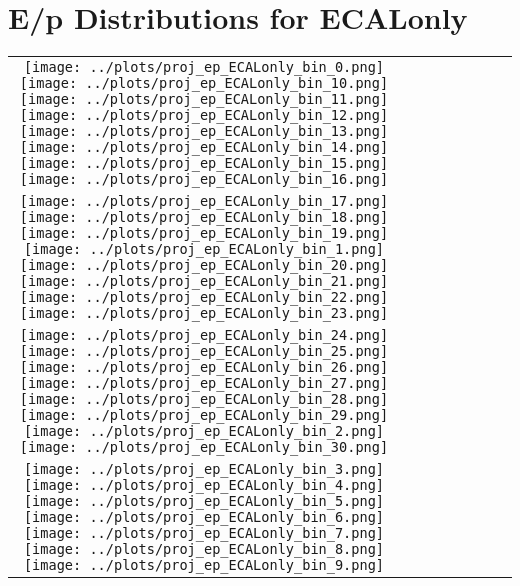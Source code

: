 \documentclass[a4paper,10pt]{article}
\begin{document}
\section*{E/p Distributions for ECALonly}
\begin{center}
\setlength{\tabcolsep}{2pt}
\renewcommand{\arraystretch}{1.0}
\begin{tabular}{cccccccc}
    \texttt{[image: ../plots/proj\_ep\_ECALonly\_bin\_0.png]} %
    \texttt{[image: ../plots/proj\_ep\_ECALonly\_bin\_10.png]} %
    \texttt{[image: ../plots/proj\_ep\_ECALonly\_bin\_11.png]} %
    \texttt{[image: ../plots/proj\_ep\_ECALonly\_bin\_12.png]} %
    \texttt{[image: ../plots/proj\_ep\_ECALonly\_bin\_13.png]} %
    \texttt{[image: ../plots/proj\_ep\_ECALonly\_bin\_14.png]} %
    \texttt{[image: ../plots/proj\_ep\_ECALonly\_bin\_15.png]} %
    \texttt{[image: ../plots/proj\_ep\_ECALonly\_bin\_16.png]} \\
    \texttt{[image: ../plots/proj\_ep\_ECALonly\_bin\_17.png]} %
    \texttt{[image: ../plots/proj\_ep\_ECALonly\_bin\_18.png]} %
    \texttt{[image: ../plots/proj\_ep\_ECALonly\_bin\_19.png]} %
    \texttt{[image: ../plots/proj\_ep\_ECALonly\_bin\_1.png]} %
    \texttt{[image: ../plots/proj\_ep\_ECALonly\_bin\_20.png]} %
    \texttt{[image: ../plots/proj\_ep\_ECALonly\_bin\_21.png]} %
    \texttt{[image: ../plots/proj\_ep\_ECALonly\_bin\_22.png]} %
    \texttt{[image: ../plots/proj\_ep\_ECALonly\_bin\_23.png]} \\
    \texttt{[image: ../plots/proj\_ep\_ECALonly\_bin\_24.png]} %
    \texttt{[image: ../plots/proj\_ep\_ECALonly\_bin\_25.png]} %
    \texttt{[image: ../plots/proj\_ep\_ECALonly\_bin\_26.png]} %
    \texttt{[image: ../plots/proj\_ep\_ECALonly\_bin\_27.png]} %
    \texttt{[image: ../plots/proj\_ep\_ECALonly\_bin\_28.png]} %
    \texttt{[image: ../plots/proj\_ep\_ECALonly\_bin\_29.png]} %
    \texttt{[image: ../plots/proj\_ep\_ECALonly\_bin\_2.png]} %
    \texttt{[image: ../plots/proj\_ep\_ECALonly\_bin\_30.png]} \\
    \texttt{[image: ../plots/proj\_ep\_ECALonly\_bin\_3.png]} %
    \texttt{[image: ../plots/proj\_ep\_ECALonly\_bin\_4.png]} %
    \texttt{[image: ../plots/proj\_ep\_ECALonly\_bin\_5.png]} %
    \texttt{[image: ../plots/proj\_ep\_ECALonly\_bin\_6.png]} %
    \texttt{[image: ../plots/proj\_ep\_ECALonly\_bin\_7.png]} %
    \texttt{[image: ../plots/proj\_ep\_ECALonly\_bin\_8.png]} %
    \texttt{[image: ../plots/proj\_ep\_ECALonly\_bin\_9.png]} %
\end{tabular}
\end{center}
\end{document}
